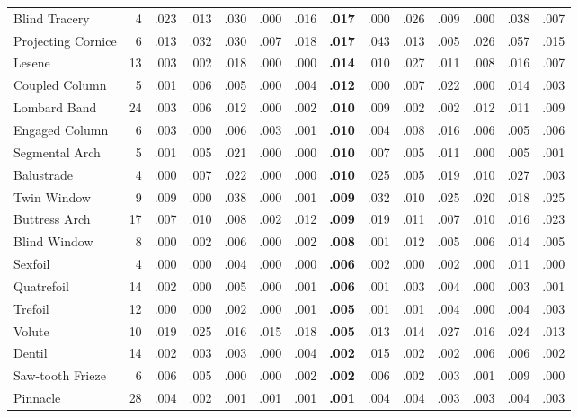 \documentclass[lineno,pdflatex,sn-mathphys-num]{sn-jnl}%
\theoremstyle{thmstyleone}%
\theoremstyle{thmstyletwo}%
\theoremstyle{thmstylethree}%
\begin{document}
\begin{appendices}
\begin{table}[!htbp]
\begin{tabular}{@{}lrcccccccccccc@{}}
Blind Tracery & 4 & .023 & .013 & .030 & .000 & .016 & \textbf{.017} & .000 & .026 & .009 & .000 & .038 & .007 \\
Projecting Cornice & 6 & .013 & .032 & .030 & .007 & .018 & \textbf{.017} & .043 & .013 & .005 & .026 & .057 & .015 \\
Lesene & 13 & .003 & .002 & .018 & .000 & .000 & \textbf{.014} & .010 & .027 & .011 & .008 & .016 & .007 \\
Coupled Column & 5 & .001 & .006 & .005 & .000 & .004 & \textbf{.012} & .000 & .007 & .022 & .000 & .014 & .003 \\
Lombard Band & 24 & .003 & .006 & .012 & .000 & .002 & \textbf{.010} & .009 & .002 & .002 & .012 & .011 & .009 \\
Engaged Column & 6 & .003 & .000 & .006 & .003 & .001 & \textbf{.010} & .004 & .008 & .016 & .006 & .005 & .006 \\
Segmental Arch & 5 & .001 & .005 & .021 & .000 & .000 & \textbf{.010} & .007 & .005 & .011 & .000 & .005 & .001 \\
Balustrade & 4 & .000 & .007 & .022 & .000 & .000 & \textbf{.010} & .025 & .005 & .019 & .010 & .027 & .003 \\
Twin Window & 9 & .009 & .000 & .038 & .000 & .001 & \textbf{.009} & .032 & .010 & .025 & .020 & .018 & .025 \\
Buttress Arch & 17 & .007 & .010 & .008 & .002 & .012 & \textbf{.009} & .019 & .011 & .007 & .010 & .016 & .023 \\
Blind Window & 8 & .000 & .002 & .006 & .000 & .002 & \textbf{.008} & .001 & .012 & .005 & .006 & .014 & .005 \\
Sexfoil & 4 & .000 & .000 & .004 & .000 & .000 & \textbf{.006} & .002 & .000 & .002 & .000 & .011 & .000 \\
Quatrefoil & 14 & .002 & .000 & .005 & .000 & .001 & \textbf{.006} & .001 & .003 & .004 & .000 & .003 & .001 \\
Trefoil & 12 & .000 & .000 & .002 & .000 & .001 & \textbf{.005} & .001 & .001 & .004 & .000 & .004 & .003 \\
Volute & 10 & .019 & .025 & .016 & .015 & .018 & \textbf{.005} & .013 & .014 & .027 & .016 & .024 & .013 \\
Dentil & 14 & .002 & .003 & .003 & .000 & .004 & \textbf{.002} & .015 & .002 & .002 & .006 & .006 & .002 \\
Saw-tooth Frieze & 6 & .006 & .005 & .000 & .000 & .002 & \textbf{.002} & .006 & .002 & .003 & .001 & .009 & .000 \\
Pinnacle & 28 & .004 & .002 & .001 & .001 & .001 & \textbf{.001} & .004 & .004 & .003 & .003 & .004 & .003 \\

\end{tabular}
\end{table}
\end{appendices}
\end{document}
